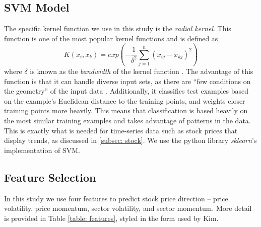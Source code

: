 \documentclass[pageno]{jpaper}
\begin{document}
\subsection{SVM Model}

The specific kernel function we use in this study is the {\em radial kernel}. This function is one of the most popular kernel functions and is defined as 
$$K(x_i, x_k) = exp\left(-\frac{1}{\delta^2}\sum_{j=1}^n(x_{ij}-x_{kj})^2\right)$$
where $\delta$ is known as the {\em bandwidth} of the kernel function \cite{kim}. The advantage of this function is that it can handle diverse input sets, as there are ``few conditions on the geometry'' of the input data \cite{buhmann}. Additionally, it classifies test examples based on the example's Euclidean distance to the training points, and weights closer training points more heavily. This means that classification is based heavily on the most similar training examples and takes advantage of patterns in the data. This is exactly what is needed for time-series data such as stock prices that display trends, as discussed in \ref{subsec: stock}. We use the python library {\em sklearn}'s implementation of SVM.

\subsection{Feature Selection}
In this study we use four features to predict stock price direction -- price volatility, price momentum, sector volatility, and sector momentum. More detail is provided in Table \ref{table: features}, styled in the form used by Kim\cite{kim}.
\end{document}
